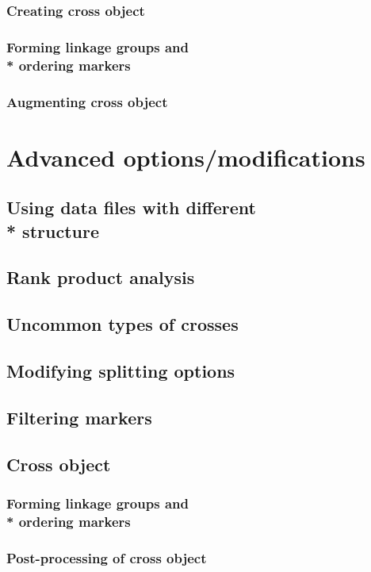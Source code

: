 \documentclass{article}
\begin{document}
\subsubsection{Creating cross object}
\blindtext
\subsubsection{Forming linkage groups and \\* ordering markers}
\blindtext
\subsubsection{Augmenting cross object}
\blindtext

\newpage
\section{Advanced options/modifications}

\subsection{Using data files with different \\* structure}
\blindtext
\subsection{Rank product analysis}
\blindtext
\subsection{Uncommon types of crosses}
\blindtext
\subsection{Modifying splitting options}
\blindtext
\subsection{Filtering markers}
\blindtext
\subsection{Cross object}
\blindtext
\subsubsection{Forming linkage groups and \\* ordering markers}
\blindtext
\subsubsection{Post-processing of cross object}
\blindtext
\end{document}
